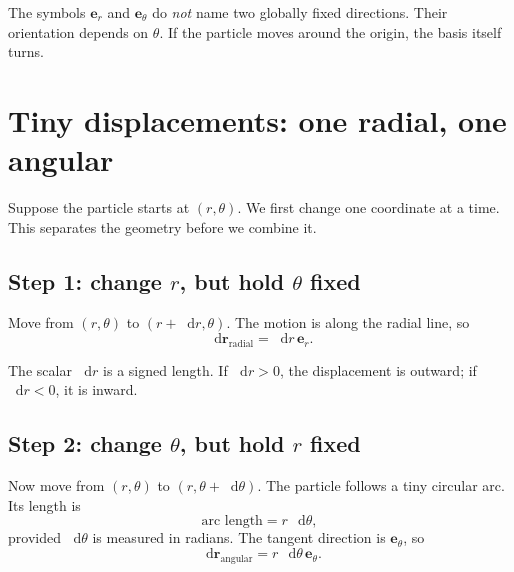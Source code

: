 \documentclass[11pt,a4paper]{article}
\newcommand{\er}{\bm e_r}
\newcommand{\etheta}{\bm e_\theta}
\newcommand{\rr}{\bm r}
\newcommand{\dd}{\mathop{}\!\mathrm d}
\begin{document}
\begin{notecheck}
The symbols $\er$ and $\etheta$ do \emph{not} name two globally fixed directions. Their orientation depends on $\theta$. If the particle moves around the origin, the basis itself turns.
\end{notecheck}

\clearpage

\section{Tiny displacements: one radial, one angular}

Suppose the particle starts at $(r,\theta)$. We first change one coordinate at a time. This separates the geometry before we combine it.

\subsection{Step 1: change $r$, but hold $\theta$ fixed}

Move from $(r,\theta)$ to $(r+\dd r,\theta)$. The motion is along the radial line, so
\[
  \dd\rr_{\text{radial}}=\dd r\,\er.
\]

The scalar $\dd r$ is a signed length. If $\dd r>0$, the displacement is outward; if $\dd r<0$, it is inward.

\subsection{Step 2: change $\theta$, but hold $r$ fixed}

Now move from $(r,\theta)$ to $(r,\theta+\dd\theta)$. The particle follows a tiny circular arc. Its length is
\[
  \text{arc length}=r\,\dd\theta,
\]
provided $\dd\theta$ is measured in radians. The tangent direction is $\etheta$, so
\[
  \dd\rr_{\text{angular}}=r\,\dd\theta\,\etheta.
\]
\end{document}
